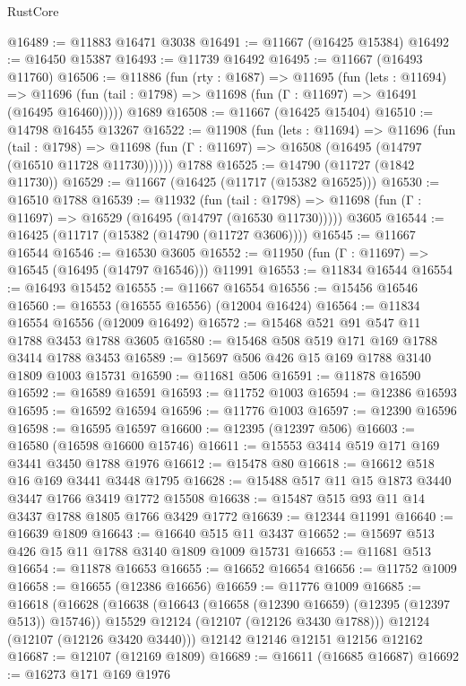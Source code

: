 \begin{lexlean}{RustCore}
\begin{coremodule}
@16489 := @11883 @16471 @3038
@16491 := @11667 (@16425 @15384)
@16492 := @16450 @15387
@16493 := @11739 @16492
@16495 := @11667 (@16493 @11760)
@16506 := @11886
    (fun (rty : @1687) =>
    @11695
      (fun (lets : @11694) =>
      @11696 (fun (tail : @1798) => @11698 (fun (Γ : @11697) => @16491 (@16495 @16460)))))
    @1689
@16508 := @11667 (@16425 @15404)
@16510 := @14798 @16455 @13267
@16522 := @11908
    (fun (lets : @11694) =>
    @11696
      (fun (tail : @1798) =>
      @11698 (fun (Γ : @11697) => @16508 (@16495 (@14797 (@16510 @11728 @11730))))))
    @1788
@16525 := @14790 (@11727 (@1842 @11730))
@16529 := @11667 (@16425 (@11717 (@15382 @16525)))
@16530 := @16510 @1788
@16539 := @11932
    (fun (tail : @1798) => @11698 (fun (Γ : @11697) => @16529 (@16495 (@14797 (@16530 @11730)))))
    @3605
@16544 := @16425 (@11717 (@15382 (@14790 (@11727 @3606))))
@16545 := @11667 @16544
@16546 := @16530 @3605
@16552 := @11950 (fun (Γ : @11697) => @16545 (@16495 (@14797 @16546))) @11991
@16553 := @11834 @16544
@16554 := @16493 @15452
@16555 := @11667 @16554
@16556 := @15456 @16546
@16560 := @16553 (@16555 @16556) (@12004 @16424)
@16564 := @11834 @16554 @16556 (@12009 @16492)
@16572 := @15468 @521 @91 @547 @11 @1788 @3453 @1788 @3605
@16580 := @15468 @508 @519 @171 @169 @1788 @3414 @1788 @3453
@16589 := @15697 @506 @426 @15 @169 @1788 @3140 @1809 @1003 @15731
@16590 := @11681 @506
@16591 := @11878 @16590
@16592 := @16589 @16591
@16593 := @11752 @1003
@16594 := @12386 @16593
@16595 := @16592 @16594
@16596 := @11776 @1003
@16597 := @12390 @16596
@16598 := @16595 @16597
@16600 := @12395 (@12397 @506)
@16603 := @16580 (@16598 @16600 @15746)
@16611 := @15553 @3414 @519 @171 @169 @3441 @3450 @1788 @1976
@16612 := @15478 @80
@16618 := @16612 @518 @16 @169 @3441 @3448 @1795
@16628 := @15488 @517 @11 @15 @1873 @3440 @3447 @1766 @3419 @1772 @15508
@16638 := @15487 @515 @93 @11 @14 @3437 @1788 @1805 @1766 @3429 @1772
@16639 := @12344 @11991
@16640 := @16639 @1809
@16643 := @16640 @515 @11 @3437
@16652 := @15697 @513 @426 @15 @11 @1788 @3140 @1809 @1009 @15731
@16653 := @11681 @513
@16654 := @11878 @16653
@16655 := @16652 @16654
@16656 := @11752 @1009
@16658 := @16655 (@12386 @16656)
@16659 := @11776 @1009
@16685 := @16618
    (@16628
      (@16638
        (@16643 (@16658 (@12390 @16659) (@12395 (@12397 @513)) @15746))
        @15529
        @12124
        (@12107 (@12126 @3430 @1788)))
      @12124
      (@12107 (@12126 @3420 @3440)))
    @12142
    @12146
    @12151
    @12156
    @12162
@16687 := @12107 (@12169 @1809)
@16689 := @16611 (@16685 @16687)
@16692 := @16273 @171 @169 @1976

\end{coremodule}
\end{lexlean}
